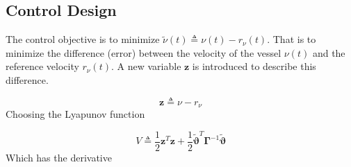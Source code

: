 \documentclass[12pt,a4]{article}
\begin{document}
\subsection{Control Design}
The control objective is to minimize $\tilde{\nu}(t) \triangleq \nu(t) - r_{\nu}(t)$.
That is to minimize the difference (error) between the velocity of the vessel $\nu(t)$ and the reference velocity $r_{\nu}(t)$.
A new variable $\bm{z}$ is introduced to describe this difference.

\begin{equation}
	\bm{z} \triangleq \nu - r_{\nu}
\end{equation}
Choosing the Lyapunov function

\begin{equation}
	V \triangleq \frac{1}{2}\bm{z}^T\bm{z} + \frac{1}{2}\bm{\tilde{\vartheta}}^T\bm{\Gamma}^{-1}\bm{\tilde{\vartheta}}
\end{equation}
Which has the derivative
\end{document}
